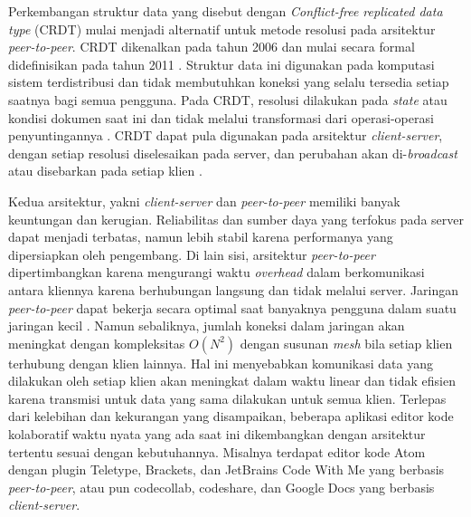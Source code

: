 Perkembangan struktur data yang disebut dengan \textit{Conflict-free replicated data type} (CRDT) mulai menjadi alternatif untuk metode resolusi pada arsitektur \textit{peer-to-peer}. CRDT dikenalkan pada tahun 2006 dan mulai secara formal didefinisikan pada tahun 2011 \citep{Shapiro2011}. Struktur data ini digunakan pada komputasi sistem terdistribusi dan tidak membutuhkan koneksi yang selalu tersedia setiap saatnya bagi semua pengguna. Pada CRDT, resolusi dilakukan pada \textit{state} atau kondisi dokumen saat ini dan tidak melalui transformasi dari operasi-operasi penyuntingannya \citep{CRDToverview1}. CRDT dapat pula digunakan pada arsitektur \textit{client-server}, dengan setiap resolusi diselesaikan pada server, dan perubahan akan di-\textit{broadcast} atau disebarkan pada setiap klien \citep{Sun2019First}.

Kedua arsitektur, yakni \textit{client-server} dan \textit{peer-to-peer} memiliki banyak keuntungan dan kerugian. Reliabilitas dan sumber daya yang terfokus pada server dapat menjadi terbatas, namun lebih stabil karena performanya yang dipersiapkan oleh pengembang. Di lain sisi, arsitektur \textit{peer-to-peer} dipertimbangkan karena mengurangi waktu \textit{overhead} dalam berkomunikasi antara kliennya karena berhubungan langsung dan tidak melalui server. Jaringan \textit{peer-to-peer} dapat bekerja secara optimal saat banyaknya pengguna dalam suatu jaringan kecil \citep{leibnitz2007peer, maly2003comparison}. Namun sebaliknya, jumlah koneksi dalam jaringan akan meningkat dengan kompleksitas $O(N^2)$ dengan susunan \textit{mesh} bila setiap klien terhubung dengan klien lainnya. Hal ini menyebabkan komunikasi data yang dilakukan oleh setiap klien akan meningkat dalam waktu linear dan tidak efisien karena transmisi untuk data yang sama dilakukan untuk semua klien. Terlepas dari kelebihan dan kekurangan yang disampaikan, beberapa aplikasi editor kode kolaboratif waktu nyata yang ada saat ini dikembangkan dengan arsitektur tertentu sesuai dengan kebutuhannya. Misalnya terdapat editor kode Atom dengan plugin Teletype, Brackets, dan JetBrains Code With Me yang berbasis \textit{peer-to-peer}, atau pun codecollab, codeshare, dan Google Docs yang berbasis \textit{client-server}.

